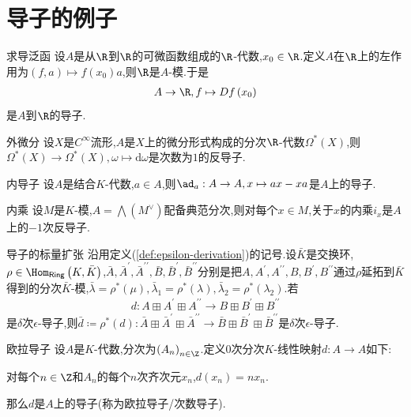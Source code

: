 \section{导子的例子}

\begin{example}{求导泛函}{}
	设$A$是从$\R$到$\R$的可微函数组成的$\R$-代数,$x_{0}\in\R$.定义$A$在$\R$上的左作用为$\left(f,a\right)\mapsto f\left(x_{0}\right)a$,则$\R$是$A$-模.于是
	\begin{align*}
		A\to\R,f\mapsto Df\left(x_{0}\right)
	\end{align*}
	是$A$到$\R$的导子.
\end{example}

\begin{example}{外微分}{}
	设$X$是$C^{\infty}$流形,$A$是$X$上的微分形式构成的分次$\R$-代数$\Omega^{\ast}\left(X\right)$,则$\Omega^{\ast}\left(X\right)\to\Omega^{\ast}\left(X\right),\omega\mapsto \mathrm{d}\omega$是次数为$1$的反导子.
\end{example}

\begin{example}{内导子}{}
	设$A$是结合$K$-代数,$a\in A$,则$\ad_{a}:A\to A,x\mapsto ax-xa$是$A$上的导子.
\end{example}

\begin{example}{内乘}{}
	设$M$是$K$-模,$A=\bigwedge\left(M^{\vee}\right)$配备典范分次,则对每个$x\in M$,关于$x$的内乘$i_{x}$是$A$上的$-1$次反导子.
\end{example}

\begin{example}{导子的标量扩张}{}
	沿用定义(\cref{def:epsilon-derivation})的记号.设$\bar{K}$是交换环,$\rho\in\Hom_{\mathsf{Ring}}\left(K,\bar{K}\right)$,$\bar{A},\bar{A}^{\prime},\bar{A}^{\prime\prime},\bar{B},\bar{B}^{\prime},\bar{B}^{\prime\prime}$分别是把$A,A^{\prime},A^{\prime\prime},B,B^{\prime},B^{\prime\prime}$通过$\rho$延拓到$\bar{K}$得到的分次$\bar{K}$-模,$\bar{\lambda}=\rho^{\ast}\left(\mu\right),\bar{\lambda}_{1}=\rho^{\ast}\left(\lambda\right),\bar{\lambda}_{2}=\rho^{\ast}\left(\lambda_{2}\right)$.若
	\begin{align*}
		d:A\boxplus A^{\prime}\boxplus A^{\prime\prime}\to B\boxplus B^{\prime}\boxplus B^{\prime\prime}
	\end{align*}
	是$\delta$次$\epsilon$-导子,则$\bar{d}\coloneq\rho^{\ast}\left(d\right):\bar{A}\boxplus \bar{A}^{\prime}\boxplus \bar{A}^{\prime\prime}\to \bar{B}\boxplus \bar{B}^{\prime}\boxplus \bar{B}^{\prime\prime}$是$\delta$次$\epsilon$-导子.
\end{example}

\begin{example}{欧拉导子}{}
	设$A$是$K$-代数,分次为$\left(A_{n}\right)_{n\in\Z}$.定义$0$次分次$K$-线性映射$d:A\to A$如下:
	\begin{center}
		对每个$n\in\Z$和$A_{n}$的每个$n$次齐次元$x_{n}$,$d\left(x_{n}\right)=nx_{n}$.
	\end{center}
	那么$d$是$A$上的导子(称为欧拉导子/次数导子).
\end{example}















